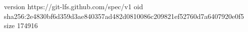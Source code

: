 version https://git-lfs.github.com/spec/v1
oid sha256:2e4830bf6d359d3ae840357ad482d0810086c209821ef52760d7a6407920e0f5
size 174916
